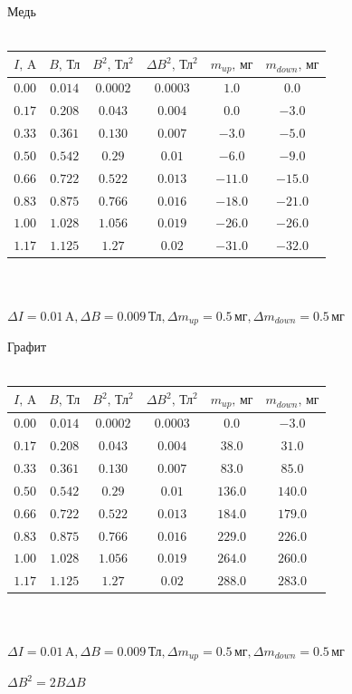 \begin{center}
Медь\\~\\
\begin{tabular}{|c|c|c|c|c|c|}\hline
$I\text{, A}$&$B\text{, Тл}$&$B^2\text{, Тл}^2$&$\Delta B^2\text{, Тл}^2$&$m_{up}\text{, мг}$&$m_{down}\text{, мг}$\\\hline
$0.00$&$0.014$&$0.0002$&$0.0003$&$1.0$&$0.0$\\\hline
$0.17$&$0.208$&$0.043$&$0.004$&$0.0$&$-3.0$\\\hline
$0.33$&$0.361$&$0.130$&$0.007$&$-3.0$&$-5.0$\\\hline
$0.50$&$0.542$&$0.29$&$0.01$&$-6.0$&$-9.0$\\\hline
$0.66$&$0.722$&$0.522$&$0.013$&$-11.0$&$-15.0$\\\hline
$0.83$&$0.875$&$0.766$&$0.016$&$-18.0$&$-21.0$\\\hline
$1.00$&$1.028$&$1.056$&$0.019$&$-26.0$&$-26.0$\\\hline
$1.17$&$1.125$&$1.27$&$0.02$&$-31.0$&$-32.0$\\\hline
\end{tabular}\\~\\
$\Delta I=0.01\,\text{A}, \Delta B=0.009\,\text{Тл}, \Delta m_{up}=0.5\,\text{мг}, \Delta m_{down}=0.5\,\text{мг}$
\end{center}

\begin{center}
Графит\\~\\
\begin{tabular}{|c|c|c|c|c|c|}\hline
$I\text{, A}$&$B\text{, Тл}$&$B^2\text{, Тл}^2$&$\Delta B^2\text{, Тл}^2$&$m_{up}\text{, мг}$&$m_{down}\text{, мг}$\\\hline
$0.00$&$0.014$&$0.0002$&$0.0003$&$0.0$&$-3.0$\\\hline
$0.17$&$0.208$&$0.043$&$0.004$&$38.0$&$31.0$\\\hline
$0.33$&$0.361$&$0.130$&$0.007$&$83.0$&$85.0$\\\hline
$0.50$&$0.542$&$0.29$&$0.01$&$136.0$&$140.0$\\\hline
$0.66$&$0.722$&$0.522$&$0.013$&$184.0$&$179.0$\\\hline
$0.83$&$0.875$&$0.766$&$0.016$&$229.0$&$226.0$\\\hline
$1.00$&$1.028$&$1.056$&$0.019$&$264.0$&$260.0$\\\hline
$1.17$&$1.125$&$1.27$&$0.02$&$288.0$&$283.0$\\\hline
\end{tabular}\\~\\
$\Delta I=0.01\,\text{A}, \Delta B=0.009\,\text{Тл}, \Delta m_{up}=0.5\,\text{мг}, \Delta m_{down}=0.5\,\text{мг}$
\end{center}
$\Delta B^2=2B\Delta B$

